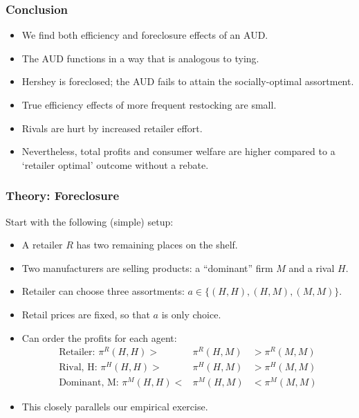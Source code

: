 \begin{frame}
\frametitle{Conclusion}
\begin{itemize}
\item We find both efficiency and foreclosure effects of an AUD.
\item The AUD functions in a way that is analogous to tying.
\item Hershey is foreclosed; the AUD fails to attain the socially-optimal assortment.
\item True efficiency effects of more frequent restocking are small.
\item Rivals are hurt by increased retailer effort.
\item Nevertheless, total profits and consumer welfare are higher compared to a `retailer optimal' outcome without a rebate.
\end{itemize}
\end{frame}


\begin{frame}[label=supplemental]
\frametitle{Theory: Foreclosure}
Start with the following (simple) setup:
\begin{itemize}
\item A retailer $R$ has two remaining places on the shelf.
\item Two manufacturers are selling products: a ``dominant'' firm $M$ and a rival $H$.
\item Retailer can choose three assortments: $a \in \{ (H,H), (H,M), (M,M)\}$.
\item Retail prices are fixed, so that $a$ is only choice.
\item Can order the profits for each agent:
\begin{eqnarray*}
\label{profitorder}
\nonumber \text{Retailer:  } \pi^R(H,H) >& \pi^R(H,M) &> \pi^R(M,M)\\
\nonumber \text{Rival, H:  }\pi^H(H,H) >& \pi^H(H,M) &> \pi^H(M,M)\\
\text{Dominant, M:  }\pi^M(H,H) <& \pi^M(H,M) &<  \pi^M(M,M)
\end{eqnarray*}
\item This closely parallels our empirical exercise.
\end{itemize}
\end{frame}


